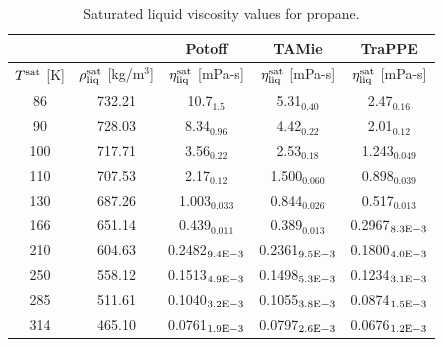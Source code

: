 \documentclass[preprint,review,11pt]{elsarticle}
\begin{document}
	\begin{table}[H]
		\caption{Saturated liquid viscosity values for propane.}
		\begin{center}
			\begin{tabular}{|c|c|c|c|c|}
				\hline
				&                                       & Potoff            & TAMie             & TraPPE            \\ \hline
				$T^{\rm sat}$ {[}K{]} & $\rho^{\rm sat}_{\rm liq}$ [kg/m$^3$] & $\eta_{\rm liq}^{\rm sat}$ {[}mPa-s{]} & $\eta_{\rm liq}^{\rm sat}$ {[}mPa-s{]} & $\eta_{\rm liq}^{\rm sat}$ {[}mPa-s{]} \\ \hline
				86 & 732.21 & 10.7$_{1.5}$      & 5.31$_{0.40}$     & 2.47$_{0.16}$     \\ \hline
				90 & 728.03 & 8.34$_{0.96}$     & 4.42$_{0.22}$     & 2.01$_{0.12}$     \\ \hline
				100  & 717.71 & 3.56$_{0.22}$     & 2.53$_{0.18}$     & 1.243$_{0.049}$   \\ \hline
				110  & 707.53 & 2.17$_{0.12}$     & 1.500$_{0.060}$   & 0.898$_{0.039}$   \\ \hline
				130  & 687.26 & 1.003$_{0.033}$   & 0.844$_{0.026}$   & 0.517$_{0.013}$   \\ \hline
				166  & 651.14 & 0.439$_{0.011}$   & 0.389$_{0.013}$   & 0.2967$_{8.3 \rm E-3}$ \\ \hline
				210  & 604.63 & 0.2482$_{9.4 \rm E-3}$ & 0.2361$_{9.5 \rm E-3}$ & 0.1800$_{4.0 \rm E-3}$ \\ \hline
				250  & 558.12 & 0.1513$_{4.9 \rm E-3}$ & 0.1498$_{5.3 \rm E-3}$ & 0.1234$_{3.1 \rm E-3}$ \\ \hline
				285  & 511.61 & 0.1040$_{3.2 \rm E-3}$ & 0.1055$_{3.8 \rm E-3}$ & 0.0874$_{1.5 \rm E-3}$ \\ \hline
				314  & 465.10 & 0.0761$_{1.9 \rm E-3}$ & 0.0797$_{2.6 \rm E-3}$ & 0.0676$_{1.2 \rm E-3}$ \\ \hline
			\end{tabular}
		\end{center}
	\end{table}
	
\end{document}
